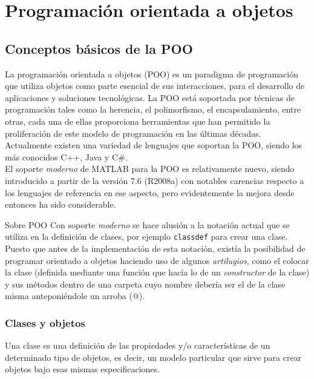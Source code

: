 \chapter{Programación orientada a objetos}\label{programacion-orientada-a-objetos}

\section{Conceptos básicos de la POO}\label{conceptos-basicos-de-la-poo}

La programación orientada a objetos (POO) es un paradigma de
programación que utiliza objetos como parte esencial de sus
interacciones, para el desarrollo de aplicaciones y soluciones
tecnológicas. La POO está soportada por técnicas de programación tales
como la herencia, el polimorfismo, el encapsulamiento, entre otras, cada
una de ellas proporciona herramientas que han permitido la proliferación
de este modelo de programación en las últimas décadas. Actualmente
existen una variedad de lenguajes que soportan la POO, siendo los más
conocidos C++, Java y C\#. \\

El soporte \emph{moderno} de MATLAB para la POO es relativamente nuevo,
siendo introducido a partir de la versión 7.6 (R2008a) con notables
carencias respecto a los lenguajes de referencia en ese aspecto, pero
evidentemente la mejora desde entonces ha sido considerable. \\

\begin{informacion}{Sobre POO}
Con soporte \emph{moderno} se hace alusión a la notación
actual que se  utiliza en la definición de clases, por
ejemplo \texttt{classdef} para crear  una clase. Puesto
que antes de la implementación de esta notación,  existía
la posibilidad de programar orientado a objetos haciendo uso
 de algunos \emph{artilugios}, como el colocar la clase
(definida mediante  una función que hacía lo de un
\emph{constructor} de la clase) y sus  métodos dentro de
una carpeta cuyo nombre debería ser el de la clase  misma
anteponiéndole un arroba (@).
\end{informacion}


\subsection{Clases y objetos}\label{clases-y-objetos}

Una clase es una definición de las propiedades y/o características de un
determinado tipo de objetos, es decir, un modelo particular que sirve
para crear objetos bajo esas mismas especificaciones. \\

